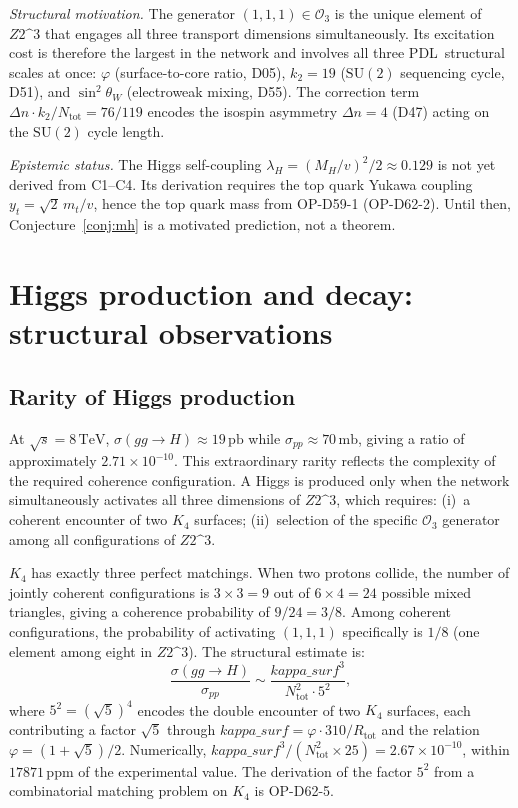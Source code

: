 \documentclass[12pt,a4paper]{article}
\theoremstyle{remark}
\newcommand{\PDL}{\textsc{pdl}}
\newcommand{\Ztwo}{\mathbb{Z}_{2}^{3}}
\newcommand{\ksurf}{\kappa_{\mathrm{surf}}}
\newcommand{\Ntot}{N_{\mathrm{tot}}}
\newcommand{\sinthW}{\sin^{2}\!\theta_{W}}
\newcommand{\ppm}{\,\mathrm{ppm}}
\newcommand{\TeV}{\,\mathrm{TeV}}
\def\PDL{PDL}%
\def\Ztwo{Z2\^{}3}%
\def\ksurf{kappa\_surf}%
\begin{document}
\emph{Structural motivation.} The generator $(1,1,1)\in\mathcal{O}_{3}$ is the
unique element of $\Ztwo$ that engages all three transport dimensions
simultaneously. Its excitation cost is therefore the largest in the network and
involves all three \PDL\ structural scales at once: $\varphi$ (surface-to-core
ratio, D05), $k_{2}=19$ ($\mathrm{SU}(2)$ sequencing cycle, D51), and
$\sinthW$ (electroweak mixing, D55). The correction term $\Delta n\cdot k_{2}/\Ntot
=76/119$ encodes the isospin asymmetry $\Delta n=4$ (D47) acting on the
$\mathrm{SU}(2)$ cycle length.

\emph{Epistemic status.} The Higgs self-coupling $\lambda_{H}=(M_{H}/v)^{2}/2
\approx0.129$ is not yet derived from C1--C4. Its derivation requires the top
quark Yukawa coupling $y_{t}=\sqrt{2}\,m_{t}/v$, hence the top quark mass from
OP-D59-1 (OP-D62-2). Until then, Conjecture~\ref{conj:mh} is a motivated
prediction, not a theorem.

\section{Higgs production and decay: structural observations}

\subsection{Rarity of Higgs production}

At $\sqrt{s}=8\TeV$, $\sigma(gg\to H)\approx19\,\mathrm{pb}$ while
$\sigma_{pp}\approx70\,\mathrm{mb}$, giving a ratio of approximately
$2.71\times10^{-10}$. This extraordinary rarity reflects the complexity of the
required coherence configuration. A Higgs is produced only when the network
simultaneously activates all three dimensions of $\Ztwo$, which requires:
(i)~a coherent encounter of two $K_{4}$ surfaces; (ii)~selection of the
specific $\mathcal{O}_{3}$ generator among all configurations of $\Ztwo$.

$K_{4}$ has exactly three perfect matchings. When two protons collide, the
number of jointly coherent configurations is $3\times3=9$ out of
$6\times4=24$ possible mixed triangles, giving a coherence probability of
$9/24=3/8$. Among coherent configurations, the probability of activating
$(1,1,1)$ specifically is $1/8$ (one element among eight in $\Ztwo$). The
structural estimate is:
\begin{equation}\label{eq:xsec}
\frac{\sigma(gg\to H)}{\sigma_{pp}} \sim \frac{\ksurf^{3}}{\Ntot^{2}\cdot5^{2}},
\end{equation}
where $5^{2}=(\sqrt{5})^{4}$ encodes the double encounter of two $K_4$
surfaces, each contributing a factor $\sqrt{5}$ through $\ksurf=\varphi\cdot310/
R_{\mathrm{tot}}$ and the relation $\varphi=(1+\sqrt{5})/2$. Numerically,
$\ksurf^{3}/(\Ntot^{2}\times25)=2.67\times10^{-10}$, within $17871\ppm$ of
the experimental value. The derivation of the factor $5^{2}$ from a
combinatorial matching problem on $K_4$ is OP-D62-5.
\end{document}
